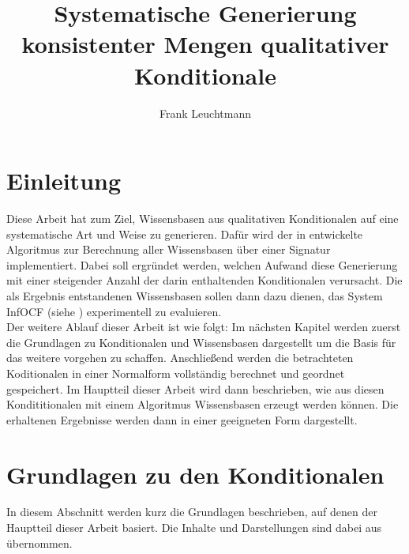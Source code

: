 \documentclass[12pt,a4paper]{article}
\author{Frank Leuchtmann}
\title{Systematische Generierung konsistenter Mengen qualitativer
Konditionale}
\begin{document}
\maketitle
\newpage
\tableofcontents
\newpage
\section{Einleitung}
Diese Arbeit hat zum Ziel, Wissensbasen aus qualitativen Konditionalen auf eine systematische Art und Weise zu generieren. Dafür wird der in \cite{beierle19} entwickelte Algoritmus zur Berechnung aller Wissensbasen über einer Signatur implementiert. Dabei soll ergründet werden, welchen Aufwand diese Generierung mit einer steigender Anzahl der darin  enthaltenden Konditionalen verursacht. Die als Ergebnis entstandenen Wissensbasen sollen dann dazu dienen, das System InfOCF (siehe \cite{beierle17}) experimentell zu evaluieren.
\\
Der weitere Ablauf dieser Arbeit ist wie folgt: Im nächsten Kapitel werden zuerst die Grundlagen zu Konditionalen und Wissensbasen dargestellt um die Basis für das weitere vorgehen zu schaffen. Anschließend werden die betrachteten Koditionalen in einer Normalform vollständig berechnet und geordnet gespeichert. Im Hauptteil dieser Arbeit wird dann beschrieben, wie aus diesen Kondititionalen mit einem Algoritmus \cite{beierle19} Wissensbasen erzeugt werden können. Die erhaltenen Ergebnisse werden dann in einer geeigneten Form dargestellt.
\section{Grundlagen zu den Konditionalen}
In diesem Abschnitt werden kurz die Grundlagen beschrieben, auf denen der Hauptteil dieser Arbeit basiert. Die Inhalte und Darstellungen sind dabei aus \cite{beierle19} übernommen.
\end{document}
